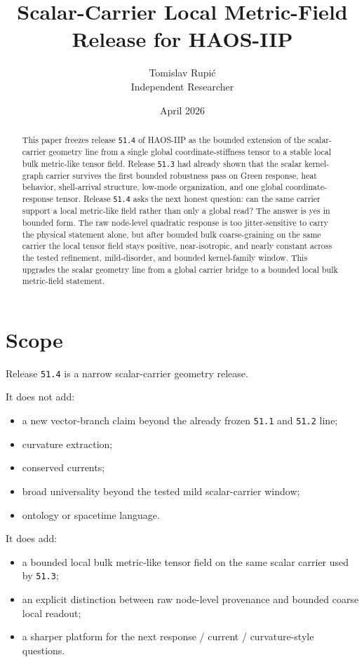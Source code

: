 \documentclass[11pt]{article}
\title{Scalar-Carrier Local Metric-Field Release for HAOS-IIP}
\author{Tomislav Rupi\'c \\ Independent Researcher}
\date{April 2026}
\begin{document}
\maketitle

\begin{abstract}
This paper freezes release \texttt{51.4} of HAOS-IIP as the bounded extension of the scalar-carrier geometry line from a single global coordinate-stiffness tensor to a stable local bulk metric-like tensor field. Release \texttt{51.3} had already shown that the scalar kernel-graph carrier survives the first bounded robustness pass on Green response, heat behavior, shell-arrival structure, low-mode organization, and one global coordinate-response tensor. Release \texttt{51.4} asks the next honest question: can the same carrier support a local metric-like field rather than only a global read? The answer is yes in bounded form. The raw node-level quadratic response is too jitter-sensitive to carry the physical statement alone, but after bounded bulk coarse-graining on the same carrier the local tensor field stays positive, near-isotropic, and nearly constant across the tested refinement, mild-disorder, and bounded kernel-family window. This upgrades the scalar geometry line from a global carrier bridge to a bounded local bulk metric-field statement.
\end{abstract}

\tableofcontents

\section{Scope}

Release \texttt{51.4} is a narrow scalar-carrier geometry release.

It does not add:
\begin{itemize}
\item a new vector-branch claim beyond the already frozen \texttt{51.1} and \texttt{51.2} line;
\item curvature extraction;
\item conserved currents;
\item broad universality beyond the tested mild scalar-carrier window;
\item ontology or spacetime language.
\end{itemize}

It does add:
\begin{itemize}
\item a bounded local bulk metric-like tensor field on the same scalar carrier used by \texttt{51.3};
\item an explicit distinction between raw node-level provenance and bounded coarse local readout;
\item a sharper platform for the next response / current / curvature-style questions.
\end{itemize}
\end{document}
